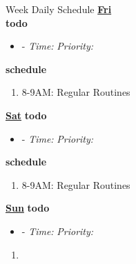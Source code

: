 \documentclass[serif, mathserif, final]{beamer}
\newcommand{\timeEst}[1]{\textit{Time:} \textit{#1}}
\newcommand{\priority}[1]{\textit{Priority:} \textit{#1}}
\newcommand{\deadline}[1]{#1}
\begin{document}
\begin{frame}{}
\begin{columns}
\begin{column}{0.50\linewidth}
\begin{block}{Week Daily Schedule}
  \textbf{\small {\underline{Fri}}} \\
  \textbf{\small todo} 
  \begin{itemize} 
    \tiny \item \tiny -  \deadline{ }   \timeEst{}  \priority{} 
  \end{itemize} 
  \textbf{\small schedule} 
  \begin{enumerate} 
    \tiny \item \tiny 8-9AM: Regular Routines 
  \end{enumerate}
  
  \textbf{\small \underline{Sat}} 
  \textbf{\small todo} 
  \begin{itemize} 
    \tiny \item \tiny -  \deadline{ }   \timeEst{}  \priority{} 
  \end{itemize} 
  \textbf{\small schedule} 
  \begin{enumerate} 
    \tiny \item \tiny 8-9AM: Regular Routines 
  \end{enumerate}

  \textbf{\small \underline{Sun}}
  \textbf{\small todo} 
  \begin{itemize} 
    \tiny \item \tiny -  \deadline{ }   \timeEst{}  \priority{} 
  \end{itemize} 
  \begin{enumerate} 
    \tiny \item \tiny 
  \end{enumerate} 
  \end{block} 

\begin{block}
\begin{calendar}{\hsize}
\noindent
{} %



\end{calendar}
\end{block}
\end{column}
\end{columns}
\end{frame}
\end{document}
